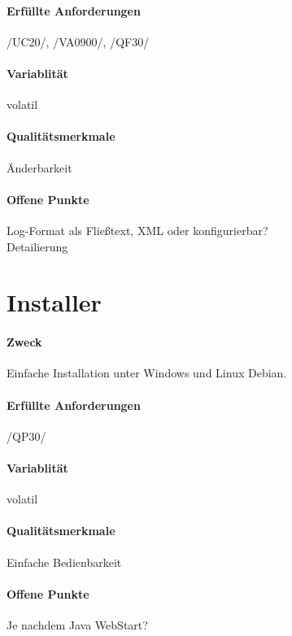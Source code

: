 \paragraph{Erfüllte Anforderungen}
/UC20/, /VA0900/, /QF30/
\paragraph{Variablität}
volatil
\paragraph{Qualitätsmerkmale}
Änderbarkeit
\paragraph{Offene Punkte}
Log-Format als Fließtext, XML oder konfigurierbar?\\
Detailierung\\

\section{Installer}
\label{sec:4:konf}
\paragraph{Zweck}
Einfache Installation unter Windows und Linux Debian.
\paragraph{Erfüllte Anforderungen}
/QP30/
\paragraph{Variablität}
volatil
\paragraph{Qualitätsmerkmale}
Einfache Bedienbarkeit
\paragraph{Offene Punkte}
Je nachdem Java WebStart?
